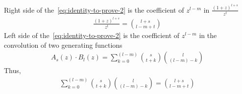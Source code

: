 Right side of the~\eqref{eq:identity-to-prove-2} is the coefficient of
$z^{l-m}$ in $\frac{(1+z)^{l+s}}{z^t}$
\begin{align*}
[z^{l-m}]
    \frac{(1+z)^{l+s}}{z^t} = \binom{l+s}{l-m+t}
\end{align*}
Left side of the~\eqref{eq:identity-to-prove-2} is the coefficient of $z^{l-m}$
in the convolution of two generating functions
\begin{align*}
[z^{l-m}]
    A_s(z) \cdot B_l(z) = \sum_{k=0}^{(l-m)} \binom{s}{t+k} \binom{l}{(l-m)-k}
\end{align*}
Thus,
\begin{align*}
    \sum_{k=0}^{(l-m)} \binom{s}{t+k} \binom{l}{(l-m)-k} = \binom{l+s}{l-m+t}
\end{align*}

\clearpage
